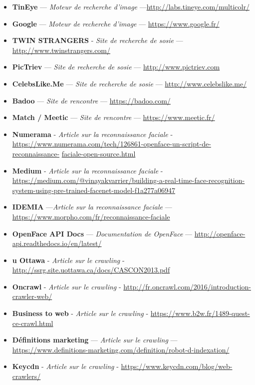 \documentclass[a4paper,12pt]{article}
\begin{document}
\begin{itemize}
    \item \textbf{TinEye} — \textit{Moteur de recherche d'image} —\url{http://labs.tineye.com/multicolr/}
    \item \textbf{Google} — \textit{Moteur de recherche d'image} — \url{https://www.google.fr/}
    \item \textbf{TWIN STRANGERS} - \textit{Site de recherche de sosie} — \url{http://www.twinstrangers.com/}
    \item \textbf{PicTriev} — \textit{Site de recherche de sosie} — \url{http://www.pictriev.com}
    \item \textbf{CelebsLike.Me} — \textit{Site de recherche de sosie} — \url{http://www.celebslike.me/}
    \item \textbf{Badoo} — \textit{Site de rencontre} — \url{https://badoo.com/}
    \item \textbf{Match / Meetic} — \textit{Site de rencontre} — \url{https://www.meetic.fr/}
    \item \textbf{Numerama} - \textit{Article sur la reconnaissance faciale} - \url{https://www.numerama.com/tech/126861-openface-un-script-de-reconnaissance-} \url{faciale-open-source.html}
    \item \textbf{Medium} - \textit{Article sur la reconnaissance faciale} - \url{https://medium.com/@vinayakvarrier/building-a-real-time-face-recognition-} \url{system-using-pre-trained-facenet-model-f1a277a06947 }
    \item \textbf{IDEMIA } —\textit{Article sur la reconnaissance faciale } — \url{https://www.morpho.com/fr/reconnaissance-faciale }
    \item \textbf{OpenFace API Docs} — \textit{Documentation de OpenFace} — \url{http://openface-api.readthedocs.io/en/latest/}
    \item \textbf{u Ottawa } - \textit{Article sur le crawling} - \url{http://ssrg.site.uottawa.ca/docs/CASCON2013.pdf }
    \item \textbf{Oncrawl } - \textit{Article sur le crawling } - \url{http://fr.oncrawl.com/2016/introduction-crawler-web/}
    \item \textbf{Business to web } - \textit{Article sur le crawling } - \url{https://www.b2w.fr/1489-quest-ce-crawl.html}
    \item \textbf{Définitions marketing } — \textit{Article sur le crawling } — \url{https://www.definitions-marketing.com/definition/robot-d-indexation/ }
    \item \textbf{Keycdn } - \textit{Article sur le crawling} - \url{https://www.keycdn.com/blog/web-crawlers/}

\end{itemize}
\end{document}
